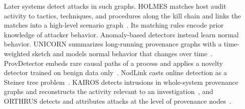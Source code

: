 Later systems detect attacks in such graphs. HOLMES matches host audit activity to
tactics, techniques, and procedures along the kill chain and links the
matches into a high-level scenario graph~\cite{milajerdi2019holmes}.
Its matching rules encode prior knowledge of attacker behavior. Anomaly-based
detectors instead learn normal behavior. UNICORN summarizes long-running
provenance graphs with a time-weighted sketch and models normal
behavior that changes over time~\cite{han2020unicorn}.
ProvDetector embeds rare causal paths of a process and applies a
novelty detector trained on benign data only~\cite{wang2020you}.
NodLink casts online detection as a Steiner tree
problem~\cite{li2024nodlink}.
KAIROS detects intrusions in whole-system provenance
graphs and reconstructs the activity relevant to an
investigation~\cite{cheng2024kairos}, and ORTHRUS detects and attributes
attacks at the level of provenance nodes~\cite{jiang2025orthrus}.

